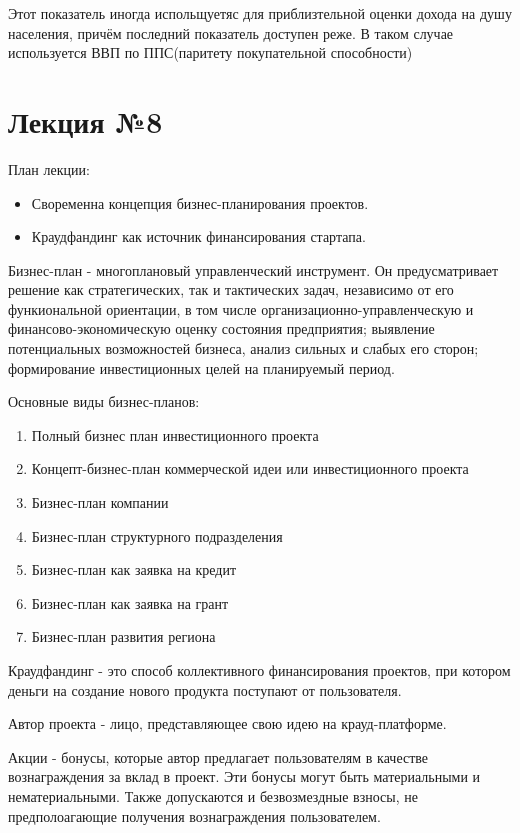 \documentclass[a4paper, 12pt]{article}
\begin{document}
	Этот показатель иногда испольщуетяс для приблизтельной оценки дохода на душу населения, причём последний показатель доступен реже. В таком случае используется ВВП по ППС(паритету покупательной способности)
	
	\part{Лекция №8}
	
	План лекции:
	\begin{itemize}
		\item Своременна концепция бизнес-планирования проектов.
		\item Краудфандинг как источник финансирования стартапа.
	\end{itemize}
	
	Бизнес-план - многоплановый управленческий инструмент. Он предусматривает решение как стратегических, так и тактических задач, независимо от его функиональной ориентации, в том числе организационно-управленческую и финансово-экономическую оценку состояния предприятия; выявление потенциальных возможностей бизнеса, анализ сильных и слабых его сторон; формирование инвестиционных целей на планируемый период.
	
	Основные виды бизнес-планов:
	\begin{enumerate}
		\item Полный бизнес план инвестиционного проекта
		\item Концепт-бизнес-план коммерческой идеи или инвестиционного проекта
		\item Бизнес-план компании
		\item Бизнес-план структурного подразделения
		\item Бизнес-план как заявка на кредит
		\item Бизнес-план как заявка на грант
		\item Бизнес-план развития региона
	\end{enumerate}

	Краудфандинг - это способ коллективного финансирования проектов, при котором деньги на создание нового продукта поступают от пользователя.
	
	Автор проекта - лицо, представляющее свою идею на крауд-платформе.
	
	Акции - бонусы, которые автор предлагает пользователям в качестве вознаграждения за вклад в проект. Эти бонусы могут быть материальными и нематериальными. Также допускаются и безвозмездные взносы, не предполоагающие получения вознаграждения пользователем.
	
\end{document}
